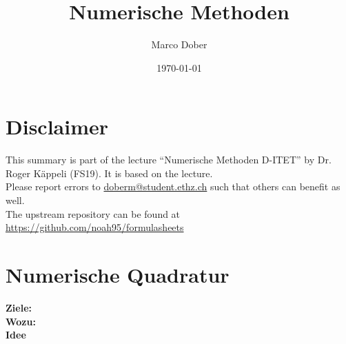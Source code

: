 \documentclass[a4paper, fontsize=8pt, landscape, DIV=1]{scrartcl}
\title{Numerische Methoden}
\author{Marco Dober}
\date{\today}
\begin{document}
	\setcounter{secnumdepth}{3} %
	\begin{multicols*}{4}
		\section*{Disclaimer}
		This summary is part of the lecture ``Numerische Methoden D-ITET'' by Dr. Roger Käppeli (FS19). It is based on the lecture. \\[6pt]
		Please report errors to \href{mailto:doberm@student.ethz.ch}{doberm@student.ethz.ch} such that others can benefit as well.\\[6pt]	
		The upstream repository can be found at \href{https://github.com/noah95/formulasheets}{https://github.com/noah95/formulasheets}  	
		\newpage

		\maketitle 
		\thispagestyle{fancy}
		
		\section{Numerische Quadratur}
		\textbf{Ziele:}\\
		\textbf{Wozu:}\\
		\textbf{Idee}\\
		
 
		\end{multicols*}
	\setcounter{secnumdepth}{3}
\end{document}
